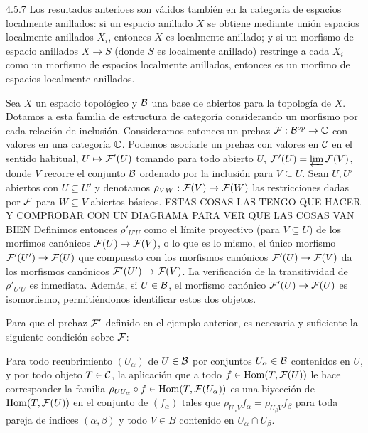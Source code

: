 \documentclass[twoside]{article}
\begin{document}
\begin{remarque}{4.5.7}\label{localmente}
Los resultados anterioes son válidos también en la categoría de espacios localmente anillados: si un espacio anillado $X$ se obtiene mediante unión espacios localmente anillados $X_i$, entonces $X$ es localmente anillado; y si un morfismo de espacio anillados $X\to S$ (donde $S$ es localmente anillado) restringe a cada $X_i$ como un morfismo de espacios localmente anillados, entonces es un morfimo de espacios localmente anillados. 
\end{remarque}

\begin{ej}[EGA, 0-3.2.1]\label{prehaztop}%
Sea $X$ un espacio topológico y ${\mathcal B}$ una base de abiertos para la topología de $X$. Dotamos a esta familia de estructura de categoría considerando un morfismo por cada relación de inclusión. Consideramos entonces un prehaz $\mathcal{F}:{\mathcal B}^{op}\to\mathbb{C}$ con valores en una categoría $\mathbb{C}$. Podemos asociarle un prehaz con valores en ${\mathcal C}$ en el sentido habitual, $U\mapsto \mathcal{F}'(U)$ tomando para todo abierto $U$, $\mathcal{F}'(U)=\varprojlim\mathcal{F}(V)$, donde $V$ recorre el conjunto ${\mathcal B}$ ordenado por la inclusión para $V\subseteq U$. Sean $U,U'$ abiertos con $U\subseteq U'$ y denotamos $\rho_{VW}:\mathcal{F}(V)\to\mathcal{F}(W)$ las restricciones dadas por $\mathcal{F}$ para $W\subseteq V$ abiertos básicos. ESTAS COSAS LAS TENGO QUE HACER Y COMPROBAR CON UN DIAGRAMA PARA VER QUE LAS COSAS VAN BIEN Definimos entonces $\rho'_{U'U}$ como el límite proyectivo (para $V\subseteq U$) de los morfimos canónicos $\mathcal{F}(U)\to\mathcal{F}(V)$, o lo que es lo mismo, el único morfismo $\mathcal{F}'(U')\to\mathcal{F}(U)$ que compuesto con los morfismos canónicos $\mathcal{F}'(U)\to\mathcal{F}(V)$ da los morfismos canónicos $\mathcal{F}'(U')\to\mathcal{F}(V)$. La verificación de la transitividad de $\rho'_{U'U}$ es inmediata. Además, si $U\in{\mathcal B}$, el morfismo canónico $\mathcal{F}'(U)\to\mathcal{F}(U)$ es isomorfismo, permitiéndonos identificar estos dos objetos.
\end{ej}
\begin{prop}[EGA, 0-3.2.2]\label{haztop}
Para que el prehaz $\mathcal{F}'$ definido en el ejemplo anterior, es necesaria y suficiente la siguiente condición sobre $\mathcal{F}$:

Para todo recubrimiento $(U_{\alpha})$ de $U\in{\mathcal B}$ por conjuntos $U_\alpha\in{\mathcal B}$ contenidos en $U$, y por todo objeto $T\in{\mathcal C}$, la aplicación que a todo $f\in\operatorname{Hom}(T,\mathcal{F}(U))$ le hace corresponder la familia $\rho_{UU_\alpha}\circ f\in\operatorname{Hom}(T,\mathcal{F}(U_\alpha))$ es una biyección de $\operatorname{Hom}(T,\mathcal{F}(U))$ en el conjunto de $(f_\alpha)$ tales que $\rho_{U_\alpha V}f_\alpha=\rho_{U_\beta V}f_\beta$ para toda pareja de índices $(\alpha,\beta)$ y todo $V\in B$ contenido en $U_\alpha\cap U_\beta$. 
\end{prop}
\begin{dem}
 \end{dem}
\end{document}
